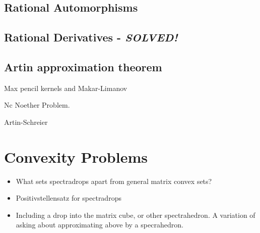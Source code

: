 \documentclass[oneside]{amsbook}
\numberwithin{equation}{section}
\begin{document}


\bigskip

\section{Rational Automorphisms}
	\label{sec:RatAuts}








\bigskip

\section{Rational Derivatives - \textit{SOLVED!}}
	\label{sec:RatDeriv}
	









\section{Artin approximation theorem}
	\label{sec:ArtinApprox}
	



\vspace{1em}


Max pencil kernels and Makar-Limanov

Nc Noether Problem.

Artin-Schreier



\chapter{Convexity Problems}

\begin{itemize}
\item What sets spectradrops apart from general matrix convex sets?

\item Positivstellensatz for spectradrops

\item Including a drop into the matrix cube, or other spectrahedron. A variation
of asking about approximating above by a specrahedron.

\end{itemize}
\end{document}
